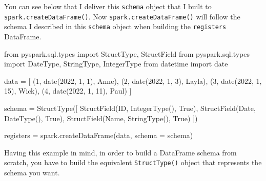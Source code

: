 \documentclass[
  11pt,
  letterpaper,
  DIV=11,
  numbers=noendperiod]{scrreprt}
\newenvironment{Shaded}{\begin{snugshade}}{\end{snugshade}}
\newcommand{\DecValTok}[1]{\textcolor[rgb]{0.68,0.00,0.00}{#1}}
\newcommand{\ImportTok}[1]{\textcolor[rgb]{0.00,0.46,0.62}{#1}}
\newcommand{\NormalTok}[1]{\textcolor[rgb]{0.00,0.23,0.31}{#1}}
\newcommand{\OperatorTok}[1]{\textcolor[rgb]{0.37,0.37,0.37}{#1}}
\newcommand{\StringTok}[1]{\textcolor[rgb]{0.13,0.47,0.30}{#1}}
\newcommand{\VariableTok}[1]{\textcolor[rgb]{0.07,0.07,0.07}{#1}}
\begin{document}
You can see below that I deliver this \texttt{schema} object that I
built to \texttt{spark.createDataFrame()}. Now
\texttt{spark.createDataFrame()} will follow the schema I described in
this \texttt{schema} object when building the \texttt{registers}
DataFrame.

\begin{Shaded}
\begin{Highlighting}[]
\ImportTok{from}\NormalTok{ pyspark.sql.types }\ImportTok{import}\NormalTok{ StructType, StructField}
\ImportTok{from}\NormalTok{ pyspark.sql.types }\ImportTok{import}\NormalTok{ DateType, StringType, IntegerType}
\ImportTok{from}\NormalTok{ datetime }\ImportTok{import}\NormalTok{ date}

\NormalTok{data }\OperatorTok{=}\NormalTok{ [}
\NormalTok{  (}\DecValTok{1}\NormalTok{, date(}\DecValTok{2022}\NormalTok{, }\DecValTok{1}\NormalTok{, }\DecValTok{1}\NormalTok{), }\StringTok{\textquotesingle{}Anne\textquotesingle{}}\NormalTok{),}
\NormalTok{  (}\DecValTok{2}\NormalTok{, date(}\DecValTok{2022}\NormalTok{, }\DecValTok{1}\NormalTok{, }\DecValTok{3}\NormalTok{), }\StringTok{\textquotesingle{}Layla\textquotesingle{}}\NormalTok{),}
\NormalTok{  (}\DecValTok{3}\NormalTok{, date(}\DecValTok{2022}\NormalTok{, }\DecValTok{1}\NormalTok{, }\DecValTok{15}\NormalTok{), }\StringTok{\textquotesingle{}Wick\textquotesingle{}}\NormalTok{),}
\NormalTok{  (}\DecValTok{4}\NormalTok{, date(}\DecValTok{2022}\NormalTok{, }\DecValTok{1}\NormalTok{, }\DecValTok{11}\NormalTok{), }\StringTok{\textquotesingle{}Paul\textquotesingle{}}\NormalTok{)}
\NormalTok{]}

\NormalTok{schema }\OperatorTok{=}\NormalTok{ StructType([}
\NormalTok{  StructField(}\StringTok{\textquotesingle{}ID\textquotesingle{}}\NormalTok{, IntegerType(), }\VariableTok{True}\NormalTok{),}
\NormalTok{  StructField(}\StringTok{\textquotesingle{}Date\textquotesingle{}}\NormalTok{, DateType(), }\VariableTok{True}\NormalTok{),}
\NormalTok{  StructField(}\StringTok{\textquotesingle{}Name\textquotesingle{}}\NormalTok{, StringType(), }\VariableTok{True}\NormalTok{)}
\NormalTok{])}

\NormalTok{registers }\OperatorTok{=}\NormalTok{ spark.createDataFrame(data, schema }\OperatorTok{=}\NormalTok{ schema)}
\end{Highlighting}
\end{Shaded}

Having this example in mind, in order to build a DataFrame schema from
scratch, you have to build the equivalent \texttt{StructType()} object
that represents the schema you want.
\end{document}
